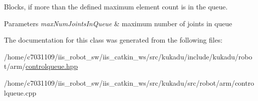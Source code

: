 Blocks, if more than the defined maximum element count is in the queue. 


\begin{DoxyParams}{Parameters}
{\em max\-Num\-Joints\-In\-Queue} & maximum number of joints in queue \\
\hline
\end{DoxyParams}


The documentation for this class was generated from the following files\-:\begin{DoxyCompactItemize}
\item 
/home/c7031109/iis\-\_\-robot\-\_\-sw/iis\-\_\-catkin\-\_\-ws/src/kukadu/include/kukadu/robot/arm/\hyperlink{controlqueue_8hpp}{controlqueue.\-hpp}\item 
/home/c7031109/iis\-\_\-robot\-\_\-sw/iis\-\_\-catkin\-\_\-ws/src/kukadu/src/robot/arm/controlqueue.\-cpp\end{DoxyCompactItemize}
